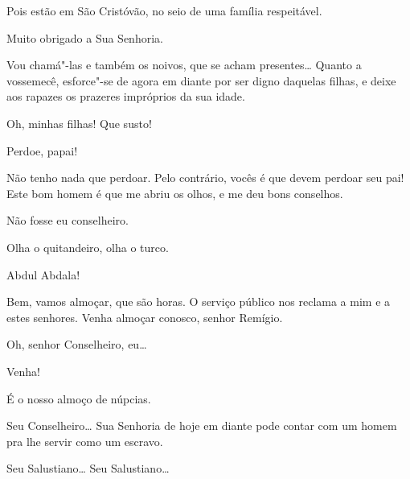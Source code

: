  Pois estão em São Cristóvão, no seio de uma família respeitável.

 Muito obrigado a Sua Senhoria.

 Vou chamá"-las e também os noivos, que se acham presentes\ldots{}
 Quanto a vossemecê,
esforce"-se de agora em diante por ser digno daquelas filhas, e deixe aos rapazes
os prazeres impróprios da sua idade.  




 Oh, minhas filhas! Que susto!

 Perdoe, papai!

 Não tenho nada que perdoar.  Pelo contrário, vocês é que
devem perdoar seu pai! Este bom homem é que me abriu os olhos, e me deu bons
conselhos.

 Não fosse eu conselheiro.

   Olha o quitandeiro, olha o
turco.

 Abdul Abdala!

 Bem, vamos almoçar, que são horas. O serviço público nos
reclama a mim e a estes senhores. Venha almoçar conosco, senhor Remígio.

 Oh, senhor Conselheiro, eu\ldots{}

 Venha!

 É o nosso almoço de núpcias. 

 Seu Conselheiro\ldots{} Sua Senhoria de hoje em diante pode contar
com um homem pra lhe servir como um escravo. 







 Seu Salustiano\ldots{} Seu Salustiano\ldots{} 

